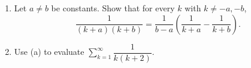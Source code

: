\begin{enumerate}
\item[(a)] Let \(a\ne b\) be constants. Show that for every \(k\) with \(k\ne -a,-b\),
\[
\dfrac{1}{(k+a)(k+b)}=\dfrac{1}{b-a}\left(\dfrac{1}{k+a}-\dfrac{1}{k+b}\right).
\]
\item[(b)] Use (a) to evaluate \(\displaystyle\sum_{k=1}^{\infty}\dfrac{1}{k(k+2)}\).
\end{enumerate}
